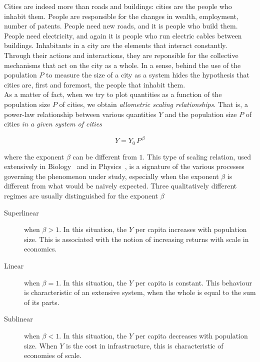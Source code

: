 Cities are indeed more than roads and buildings: cities are the people who
inhabit them. People are responsible for the changes in wealth, employment,
number of patents. People need new roads, and it is people who build them.
People need electricity, and again it is people who run electric cables between
buildings. Inhabitants in a city are the elements that interact constantly.
Through their actions and interactions, they are reponsible for the collective
mechanisms that act on the city as a whole.  In a sense, behind the use of the
population $P$ to measure the size of a city as a system hides the hypothesis 
that cities are, first and foremost, the people that inhabit them.\\

As a matter of fact, when we try to plot quantities as a function of the
population size $P$ of cities, we obtain \emph{allometric scaling
relationships}. That is, a power-law relationship between various quantities $Y$
and the population size $P$ of cities \emph{in a given system of cities} 

\begin{equation}
    Y = Y_0\,P^{\,\beta}
    \label{eq:scaling_definition}
\end{equation}

where the exponent $\beta$ can be different from $1$. This type of scaling
relation, used extensively in Biology~\cite{Thompson:1942} and in
Physics~\cite{Barenblatt:1996}, is a signature of the various processes
governing the phenomenon under study, especially when the exponent $\beta$ is
different from what would be naively expected. Three qualitatively different
regimes are usually distinguished for the exponent
$\beta$~\cite{Bettencourt:2007}

\begin{description}
    \item[Superlinear] when $\beta>1$. In this situation, the $Y$ per capita
        increases with population size. This is associated with the notion of
        increasing returns with scale in economics.
    \item[Linear] when $\beta=1$. In this situation, the $Y$ per capita is
        constant. This behaviour is characteristic of an extensive system, when
        the whole is equal to the sum of its parts.
    \item[Sublinear] when $\beta<1$. In this situation, the $Y$ per capita
        decreases with population size. When $Y$ is the cost in infrastructure,
        this is characteristic of economies of scale.
\end{description}    

